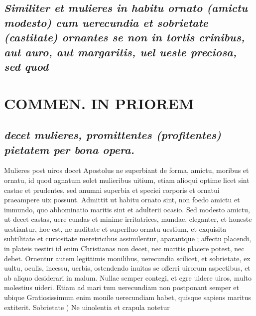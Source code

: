 \documentclass{article}
\begin{document}
\begin{pages}
\subsection*{\textit{Similiter et mulieres in habitu ornato (amictu modesto) cum uerecundia et sobrietate (castitate) ornantes se non in tortis crinibus, aut auro, aut margaritis, uel ueste preciosa, sed quod }}
\section*{COMMEN. IN PRIOREM }
\marginpar{[ p.57 ]}
{}
\subsection*{\textit{decet mulieres, promittentes (profitentes) pietatem per bona opera. }}\pstart Mulieres post uiros docet Apostolus ne superbiant de forma, amictu, moribus et ornatu, id quod agnatum solet mulieribus uitium, etiam alioqui optime licet sint castae et prudentes, sed anumni superbia et speciei corporis et ornatui praeampere uix possunt. Admittit ut habitu ornato sint, non foedo amictu et immundo, quo abhominatio maritis sint et adulterii ocasio. Sed modesto amictu, ut decet castas, uere cundas et minime irritatrices, mundae, cleganter, et honeste uestiantur, hoc est, ne nuditate et superfluo ornatu uestium, et exquisita subtilitate et curiositate meretricibus assimilentur, aparantque ; affectu placendi, in plateis uestiri id enim Christianas non decet, nec maritis placere potest, nec debet. Ornentur autem legittimis monilibus, uerecundia scilicet, et sobrietate, ex uultu, oculis, incessu, uerbis, ostendendo inuitas se offerri uirorum aspectibus, et ab aliquo desiderari in malum. Nullae semper contegi, et egre uidere uiros, multo molestius uideri. Etiam ad mari tum uerecundiam non postponant semper et ubique  Gratiosissimum enim monile uerecundiam habet, quisque sapiens maritus extiterit.  \pend\pstart Sobrietate ) Ne uinolentia et crapula notetur  \pend

\end{pages}
\end{document}

